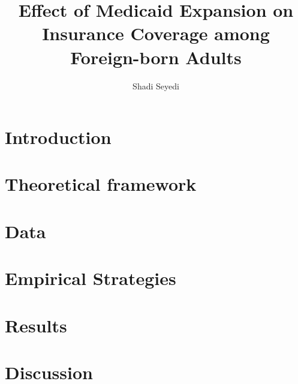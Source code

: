 \documentclass[man]{apa7}
\title{Effect of Medicaid Expansion on Insurance Coverage among Foreign-born Adults}
\author{Shadi Seyedi}
\affiliation{University of Maryland Baltimore County}
\begin{document}
\maketitle

\section{Introduction}
    
\section{Theoretical framework}
    
\section{Data}
    
\section{Empirical Strategies}
    

\section{Results}
    

\section{Discussion}
   


\printbibliography

\appendix
   
\end{document}
